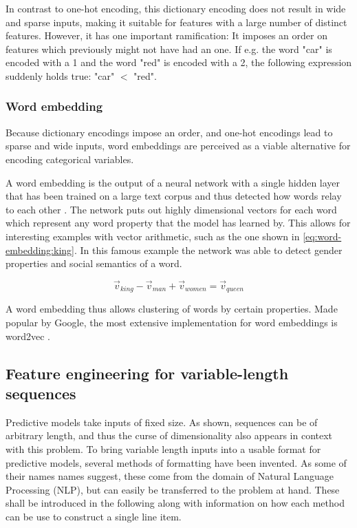 In contrast to one-hot encoding, this dictionary encoding does not result in wide and sparse inputs, making it suitable for features with a large number of distinct features. However, it has one important ramification: It imposes an order on features which previously might not have had an one. If e.g. the word "car" is encoded with a 1 and the word "red" is encoded with a 2, the following expression suddenly holds true: "car" $<$ "red".

\subsubsection*{Word embedding}
Because dictionary encodings impose an order, and one-hot encodings lead to sparse and wide inputs, word embeddings are perceived as a viable alternative for encoding categorical variables.

A word embedding is the output of a neural network with a single hidden layer that has been trained on a large text corpus and thus detected how words relay to each other \cite{web:word-embedding}. The network puts out highly dimensional vectors for each word which represent any word property that the model has learned by. This allows for interesting examples with vector arithmetic, such as the one shown in \autoref{eq:word-embedding:king}. In this famous example the network was able to detect gender properties and social semantics of a word. 

\begin{equation}
    \label{eq:word-embedding:king}
    \vec{v}_{king} - \vec{v}_{man} + \vec{v}_{women} = \vec{v}_{queen}
\end{equation}

A word embedding thus allows clustering of words by certain properties.
Made popular by Google, the most extensive implementation for word embeddings is word2vec \cite{web:ahogrammer, goldberg2014word2vec}.

\subsection{Feature engineering for variable-length sequences}
Predictive models take inputs of fixed size. As shown, sequences can be of arbitrary length, and thus the curse of dimensionality also appears in context with this problem. To bring variable length inputs into a usable format for predictive models, several methods of formatting have been invented. As some of their names names suggest, these come from the domain of Natural Language Processing (NLP), but can easily be transferred to the problem at hand. These shall be introduced in the following along with information on how each method can be use to construct a single line item.

